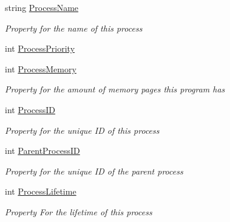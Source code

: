 \begin{DoxyCompactItemize}
string \hyperlink{class_c_p_u___o_s___simulator_1_1_operating___system_1_1_simulator_process_a8dfd5005352af61610e945094c5369b8}{Process\+Name}
\begin{DoxyCompactList}\small\item\em Property for the name of this process \end{DoxyCompactList}\item 
int \hyperlink{class_c_p_u___o_s___simulator_1_1_operating___system_1_1_simulator_process_a5f5199c59eeb6696cdff475a3d752b8a}{Process\+Priority}
\item 
int \hyperlink{class_c_p_u___o_s___simulator_1_1_operating___system_1_1_simulator_process_a2a82c535caf78396aef37d4ba7815408}{Process\+Memory}
\begin{DoxyCompactList}\small\item\em Property for the amount of memory pages this program has \end{DoxyCompactList}\item 
int \hyperlink{class_c_p_u___o_s___simulator_1_1_operating___system_1_1_simulator_process_a00d2560b1c6641c316da38e262851723}{Process\+I\+D}
\begin{DoxyCompactList}\small\item\em Property for the unique I\+D of this process \end{DoxyCompactList}\item 
int \hyperlink{class_c_p_u___o_s___simulator_1_1_operating___system_1_1_simulator_process_a2cf3da33b863fc09451e13302e9ae20f}{Parent\+Process\+I\+D}
\begin{DoxyCompactList}\small\item\em Property for the unique I\+D of the parent process \end{DoxyCompactList}\item 
int \hyperlink{class_c_p_u___o_s___simulator_1_1_operating___system_1_1_simulator_process_afa82367303a9ea2effba290493847605}{Process\+Lifetime}
\begin{DoxyCompactList}\small\item\em Property For the lifetime of this process \end{DoxyCompactList}\item 

\end{DoxyCompactItemize}
